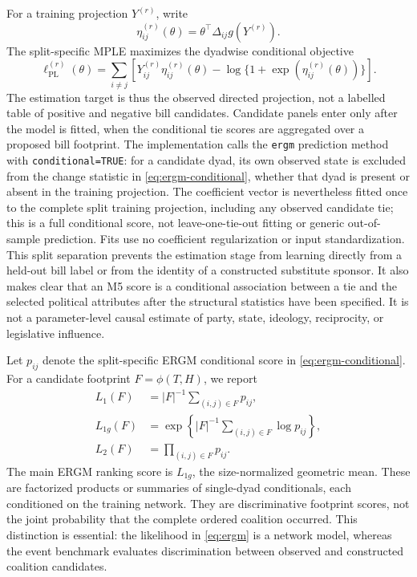 \documentclass{nws}
\begin{document}
For a training projection $Y^{(r)}$, write
\begin{equation}
 \eta_{ij}^{(r)}(\theta)=\theta^{\top}\Delta_{ij}g\left(Y^{(r)}\right).
 \label{eq:linear-predictor}
\end{equation}
The split-specific MPLE maximizes the dyadwise conditional objective
\begin{equation}
 \ell_{\mathrm{PL}}^{(r)}(\theta)=
 \sum_{i\neq j}\left[Y_{ij}^{(r)}\eta_{ij}^{(r)}(\theta)-
 \log\{1+\exp(\eta_{ij}^{(r)}(\theta))\}\right].
 \label{eq:mple-main}
\end{equation}
The estimation target is thus the observed directed projection, not a labelled table of positive and negative bill candidates. Candidate panels enter only after the model is fitted, when the conditional tie scores are aggregated over a proposed bill footprint. The implementation calls the \texttt{ergm} prediction method with \texttt{conditional=TRUE}: for a candidate dyad, its own observed state is excluded from the change statistic in \eqref{eq:ergm-conditional}, whether that dyad is present or absent in the training projection. The coefficient vector is nevertheless fitted once to the complete split training projection, including any observed candidate tie; this is a full conditional score, not leave-one-tie-out fitting or generic out-of-sample prediction. Fits use no coefficient regularization or input standardization. This split separation prevents the estimation stage from learning directly from a held-out bill label or from the identity of a constructed substitute sponsor. It also makes clear that an M5 score is a conditional association between a tie and the selected political attributes after the structural statistics have been specified. It is not a parameter-level causal estimate of party, state, ideology, reciprocity, or legislative influence.

Let $p_{ij}$ denote the split-specific ERGM conditional score in \eqref{eq:ergm-conditional}. For a candidate footprint $F=\phi(T,H)$, we report
\begin{align}
 L_1(F)&=|F|^{-1}\sum_{(i,j)\in F}p_{ij},\\
 L_{1g}(F)&=\exp\left\{|F|^{-1}\sum_{(i,j)\in F}\log p_{ij}\right\},\\
 L_2(F)&=\prod_{(i,j)\in F}p_{ij}.
 \label{eq:footprint-scores}
\end{align}
The main ERGM ranking score is $L_{1g}$, the size-normalized geometric mean. These are factorized products or summaries of single-dyad conditionals, each conditioned on the training network. They are discriminative footprint scores, not the joint probability that the complete ordered coalition occurred. This distinction is essential: the likelihood in \eqref{eq:ergm} is a network model, whereas the event benchmark evaluates discrimination between observed and constructed coalition candidates.
\end{document}
